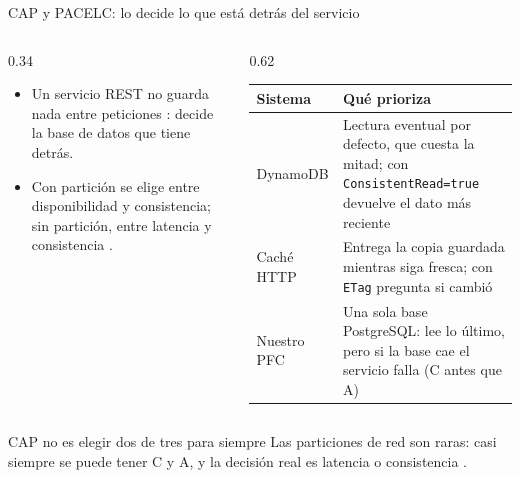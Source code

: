 \begin{frame}{CAP y PACELC: lo decide lo que está detrás del servicio}
\begin{columns}[T]
\begin{column}{0.34\textwidth}
\small
\begin{itemize}
\item Un servicio REST no guarda nada entre peticiones \cite{fielding2000}: decide la base de datos que tiene detrás.
\item Con partición se elige entre disponibilidad y consistencia; sin partición, entre latencia y consistencia \cite{abadi2012}.
\end{itemize}
\end{column}
\begin{column}{0.62\textwidth}
\footnotesize
\begin{tabularx}{\linewidth}{@{}l X@{}}
\toprule
Sistema & Qué prioriza \\
\midrule
DynamoDB & Lectura eventual por defecto, que cuesta la mitad; con \texttt{ConsistentRead=true} devuelve el dato más reciente \cite{aws_consistencia} \\
Caché HTTP & Entrega la copia guardada mientras siga fresca; con \texttt{ETag} pregunta si cambió \cite{rfc9111} \\
Nuestro PFC & Una sola base PostgreSQL: lee lo último, pero si la base cae el servicio falla (C antes que A) \\
\bottomrule
\end{tabularx}
\end{column}
\end{columns}
\begin{block}{CAP no es elegir dos de tres para siempre}
Las particiones de red son raras: casi siempre se puede tener C y A, y la decisión real es latencia o consistencia \cite{abadi2012}.
\end{block}
\end{frame}
